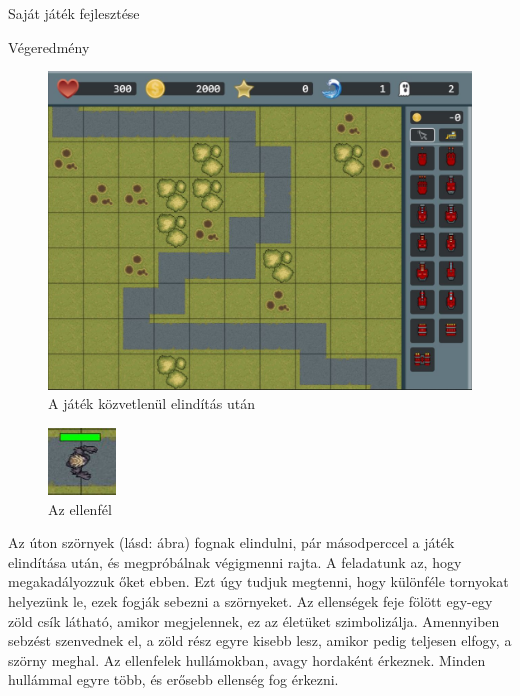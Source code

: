 \begin{MyChapter}{Saját játék fejlesztése}
\begin{MySection}{Végeredmény}
		\begin{figure}[h!]
			\centering
			\includegraphics[scale=0.57]{kepek/jatekHasznalat/game_scene}
			\caption{A játék közvetlenül elindítás után}
			\label{fig:jatekHasznalat:game_scene}
		\end{figure}
		
		\begin{figure}
			\begin{center}
				\includegraphics[width=0.16\textwidth]{kepek/jatekHasznalat/szorny}
			\end{center}
			\caption{Az ellenfél}
			\label{fig:jatekHasznalat:szorny}
		\end{figure}
		Az úton szörnyek (lásd:  ábra) fognak elindulni, pár másodperccel a játék elindítása után, és megpróbálnak végigmenni rajta.
		A feladatunk az, hogy megakadályozzuk őket ebben. Ezt úgy tudjuk megtenni, hogy különféle tornyokat helyezünk le, ezek fogják sebezni a szörnyeket.
		Az ellenségek feje fölött egy-egy zöld csík látható, amikor megjelennek, ez az életüket szimbolizálja. Amennyiben sebzést szenvednek el, a zöld rész egyre kisebb lesz, amikor pedig teljesen elfogy, a szörny meghal. Az ellenfelek hullámokban, avagy hordaként érkeznek. Minden hullámmal egyre több, és erősebb ellenség fog érkezni.
		

\end{MySection}
\end{MyChapter}
